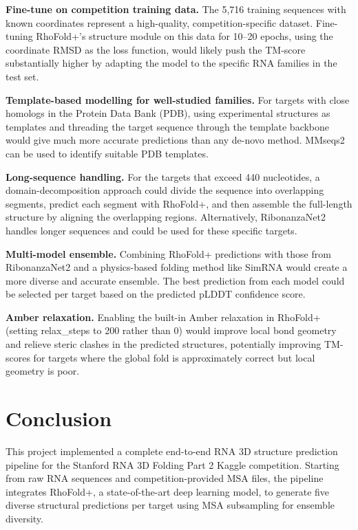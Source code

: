 \documentclass[11pt,a4paper]{article}
\begin{document}
\textbf{Fine-tune on competition training data.} The 5,716 training sequences with known coordinates represent a high-quality, competition-specific dataset. Fine-tuning RhoFold+'s structure module on this data for 10--20 epochs, using the coordinate RMSD as the loss function, would likely push the TM-score substantially higher by adapting the model to the specific RNA families in the test set.

\textbf{Template-based modelling for well-studied families.} For targets with close homologs in the Protein Data Bank (PDB), using experimental structures as templates and threading the target sequence through the template backbone would give much more accurate predictions than any de-novo method. MMseqs2 can be used to identify suitable PDB templates.

\textbf{Long-sequence handling.} For the targets that exceed 440 nucleotides, a domain-decomposition approach could divide the sequence into overlapping segments, predict each segment with RhoFold+, and then assemble the full-length structure by aligning the overlapping regions. Alternatively, RibonanzaNet2 handles longer sequences and could be used for these specific targets.

\textbf{Multi-model ensemble.} Combining RhoFold+ predictions with those from RibonanzaNet2 and a physics-based folding method like SimRNA would create a more diverse and accurate ensemble. The best prediction from each model could be selected per target based on the predicted pLDDT confidence score.

\textbf{Amber relaxation.} Enabling the built-in Amber relaxation in RhoFold+ (setting relax\_steps to 200 rather than 0) would improve local bond geometry and relieve steric clashes in the predicted structures, potentially improving TM-scores for targets where the global fold is approximately correct but local geometry is poor.

\section{Conclusion}

This project implemented a complete end-to-end RNA 3D structure prediction pipeline for the Stanford RNA 3D Folding Part 2 Kaggle competition. Starting from raw RNA sequences and competition-provided MSA files, the pipeline integrates RhoFold+, a state-of-the-art deep learning model, to generate five diverse structural predictions per target using MSA subsampling for ensemble diversity.
\end{document}
